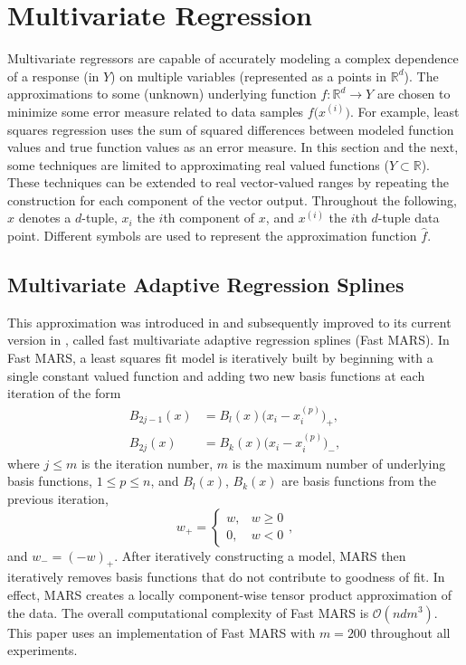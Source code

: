 \section{Multivariate Regression}
\label{sec:regression}
Multivariate regressors are capable of accurately modeling a complex
dependence of a response (in $Y$) on multiple variables (represented
as a points in $\mathbb{R}^{d}$). The approximations to some (unknown)
underlying function $f: \mathbb{R}^d \rightarrow Y$ are chosen to
minimize some error measure related to data samples
$f\bigl(x^{(i)}\bigr)$. For example, least squares regression uses the
sum of squared differences between modeled function values and true
function values as an error measure. In this section and the next,
some techniques are limited to approximating real valued functions ($Y
\subset \mathbb{R}$). These techniques can be extended to real
vector-valued ranges by repeating the construction for each component
of the vector output. Throughout the following, $x$ denotes a
$d$-tuple, $x_i$ the $i$th component of $x$, and $x^{(i)}$ the $i$th
$d$-tuple data point. Different symbols are used to represent the
approximation function $\hat f$.

\subsection{Multivariate Adaptive Regression Splines}
\label{sec:mars}
This approximation was introduced in \cite{friedman1991multivariate}
and subsequently improved to its current version in
\cite{stanford1993fast}, called fast multivariate adaptive regression
splines (Fast MARS). In Fast MARS, a least squares fit model is
iteratively built by beginning with a single constant valued function
and adding two new basis functions at each iteration of the form
\begin{align*}
  B_{2j-1}(x) &= B_l(x) \bigl(x_i-x^{(p)}_i\bigr)_+, \\
  B_{2j}(x) &= B_k(x) \bigl(x_i-x^{(p)}_i\bigr)_- ,
\end{align*}
where $j \leq m$ is the iteration number, $m$ is the maximum
  number of underlying basis functions, $1 \le p \le n$, and
$B_l(x)$, $B_k(x)$ are basis functions from the previous iteration,
 $$w_+ = \begin{cases} w, & w \geq 0 \\ 0, & w < 0 \end{cases},$$ and
$w_- = (-w)_+$. After iteratively constructing a model, MARS then
iteratively removes basis functions that do not contribute to goodness
of fit. In effect, MARS creates a locally component-wise tensor
product approximation of the data. The overall computational
complexity of Fast MARS is $\mathcal{O}(n d m^3)$. This paper
uses an implementation of Fast MARS \cite{rudy2017pyearth} with $m =
200$ throughout all experiments.

